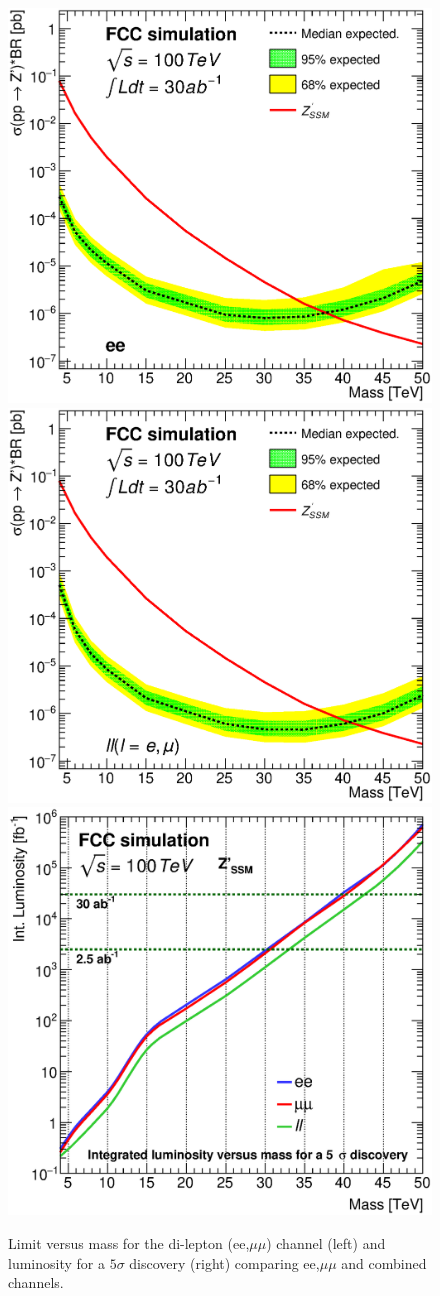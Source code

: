 \documentclass{cernrep}
\begin{document}
\begin{figure}
  \centering
  \includegraphics[width=0.3\columnwidth]{Fig/lim_Zprime_ee_fcc_v02.eps}
  \includegraphics[width=0.3\columnwidth]{Fig/lim_Zprime_ll_fcc_v02.eps}
  \includegraphics[width=0.3\columnwidth]{Fig/DiscoveryPotential_ll_comb_rootStyle.eps}
  \caption{Limit versus mass for the di-lepton (ee,$\mu\mu$) channel (left) and luminosity for a $5\sigma$ discovery (right) comparing ee,$\mu\mu$ and combined channels. }
  \label{figure:leptonicresonances:resultsll}
\end{figure}

\end{document}
